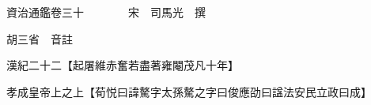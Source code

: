 










 


 
 


 

  
  
  
  
  





  
  
  
  
  
 
  

  

  
  
  



  

 
 

  
   




  

  
  


  　　資治通鑑卷三十　　　　宋　司馬光　撰

　　胡三省　音註

　　漢紀二十二【起屠維赤奮若盡著雍閹茂凡十年】

　　孝成皇帝上之上【荀悦曰諱驁字太孫驁之字曰俊應劭曰諡法安民立政曰成】

